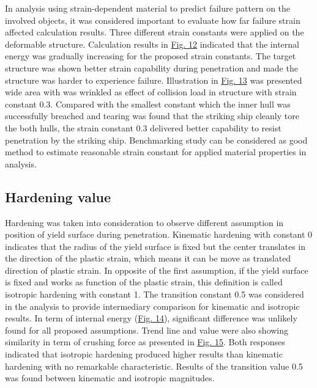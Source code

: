 \documentclass[../Final.tex]{subfiles}
\begin{document}
In analysis using strain-dependent material to predict failure pattern on the involved objects, it was considered important to evaluate how far failure strain affected calculation results. 
Three different strain constants were applied on the deformable structure. 
Calculation results in \hyperref[fig12]{Fig. 12} indicated that the internal energy was gradually increasing for the proposed strain constants. 
The target structure was shown better strain capability during penetration and made the structure was harder to experience failure. Illustration in \hyperref[fig13]{Fig. 13} was presented wide area with was wrinkled as effect 
of collision load in structure with strain constant 0.3. Compared with the smallest constant which the inner hull was successfully breached and tearing was found that the striking ship cleanly tore the both hulls, 
the strain constant 0.3 delivered better capability to resist penetration by the striking ship. 
Benchmarking study can be considered as good method to estimate reasonable strain constant for applied material properties in analysis. 

\subsection{Hardening value}

Hardening was taken into consideration to observe different assumption in position of yield surface during penetration. 
Kinematic hardening with constant 0 indicates that the radius of the yield surface is fixed but the center translates in the direction of the plastic strain, which means it can be move as translated direction of plastic strain. 
In opposite of the first assumption, if the yield surface is fixed and works as function of the plastic strain, this definition is called isotropic hardening with constant 1. 
The transition constant 0.5 was considered in the analysis to provide intermediary comparison for kinematic and isotropic results. 
In term of internal energy (\hyperref[fig14]{Fig. 14}), significant difference was unlikely found for all proposed assumptions. Trend line and value were also showing similarity in term of crushing force as presented in \hyperref[fig15]{Fig. 15}. 
Both responses indicated that isotropic hardening produced higher results than kinematic hardening with no remarkable characteristic. Results of the transition value 0.5 was found between kinematic and isotropic magnitudes. 
\end{document}
